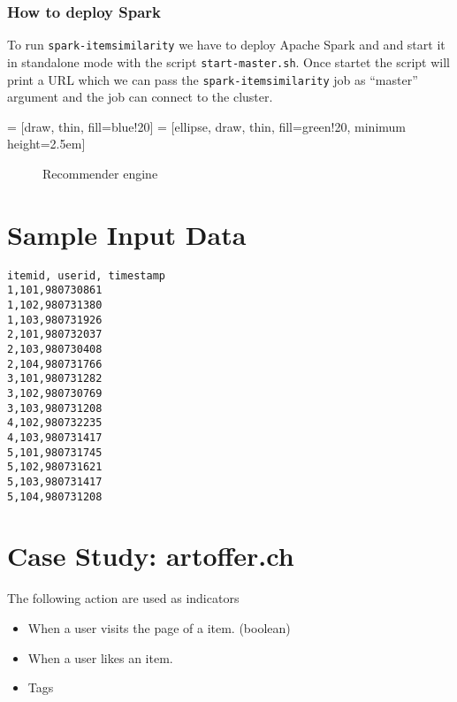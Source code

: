 \documentclass[twoside,a4paper]{article}
\begin{document}
\subsubsection{How to deploy Spark}
\label{sec:sparkdeploy}

To run \verb|spark-itemsimilarity| we have to deploy Apache Spark and and start it in standalone mode with the script \verb|start-master.sh|. Once startet the script will print a URL which we can pass the \verb|spark-itemsimilarity| job as ``master'' argument and the job can connect to the cluster. 


 = [draw, thin, fill=blue!20]
 = [ellipse, draw, thin, fill=green!20, minimum height=2.5em]
\begin{figure}
\centering
{}
\caption{Recommender engine}
\end{figure}

\section{Sample Input Data}
\label{sec:sampleinput}

\begin{lstlisting}[label=lst:sampledata]
itemid, userid, timestamp
1,101,980730861
1,102,980731380
1,103,980731926
2,101,980732037
2,103,980730408
2,104,980731766
3,101,980731282
3,102,980730769
3,103,980731208
4,102,980732235
4,103,980731417
5,101,980731745
5,102,980731621
5,103,980731417
5,104,980731208  
\end{lstlisting}

\section{Case Study: artoffer.ch}
\label{sec:artoffer}

The following action are used as indicators
\begin{itemize}
\item When a user visits the page of a item. (boolean)
\item When a user likes an item.
\item Tags
\end{itemize}
\printglossary


\end{document}

